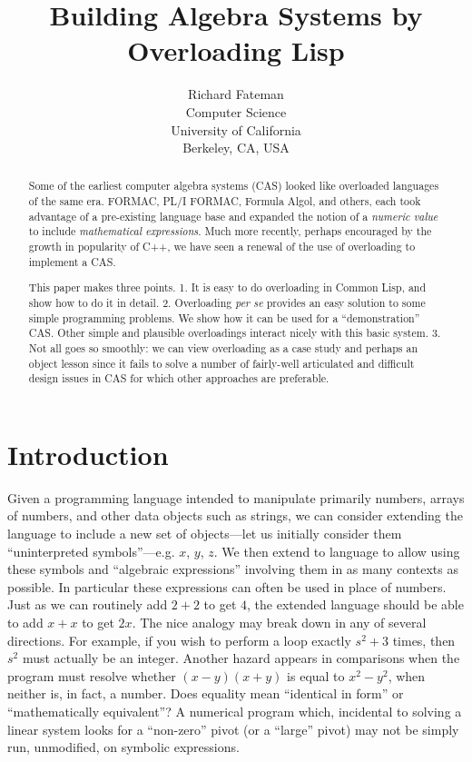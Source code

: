 \documentclass{article}
\title {Building Algebra Systems by Overloading Lisp}
\author {Richard Fateman\\
Computer Science\\
University of California\\
Berkeley, CA, USA}
\begin{document}
\maketitle
\begin{abstract}
Some of the earliest computer algebra systems (CAS) looked like
overloaded languages of the same era. FORMAC, PL/I FORMAC, Formula Algol,
and others, each took advantage of a pre-existing language base and
expanded the notion of a {\em numeric value} to include {\em
mathematical expressions}.  Much more recently, perhaps encouraged by
the growth in popularity of C++, we
have seen a renewal of the use of overloading to implement
a CAS.

This paper makes three points. 1. It is easy to do overloading in
Common Lisp, and show how to do it in detail.  2. Overloading {\em per
se} provides an easy solution to some simple programming problems. We
show how it can be used for a ``demonstration'' CAS.  Other simple and
plausible overloadings interact nicely with this basic system.  3. Not
all goes so smoothly: we can view overloading as a case study and
perhaps an object lesson since it fails to solve a number of
fairly-well articulated and difficult design issues in CAS for which
other approaches are preferable.
\end{abstract} 

\section{Introduction}

Given a programming language intended to manipulate primarily numbers,
arrays of numbers, and other data objects such as strings, we can
consider extending the language to include a new set of objects---let
us initially consider them ``uninterpreted symbols''---e.g. $x$, $y$,
$z$.  We then extend to language to allow using these symbols and
``algebraic expressions'' involving them in as many contexts as
possible. In particular these expressions can often be used in place of
numbers. Just as we can routinely add $2+2$ to get $4$, the extended
language should be able to add $x+x$ to get $2 x$.  The nice analogy
may break down in any of several directions.  For example, if you wish
to perform a loop exactly $s^2+3$ times, then $s^2$ must actually be an
integer.
Another hazard appears in comparisons when the program must
resolve whether $(x-y)(x+y)$ is
equal to $x^2-y^2$, when neither is, in fact, a number.
Does equality mean ``identical in form'' or
``mathematically equivalent''?  A numerical program which, incidental to solving a
linear system looks for a ``non-zero'' pivot (or a ``large'' pivot)
may not be simply run, unmodified, on symbolic expressions.
\end{document}
